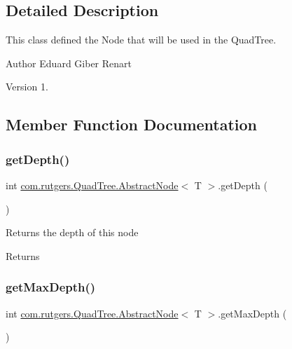 \subsection{Detailed Description}
This class defined the Node that will be used in the Quad\+Tree.

\begin{DoxyAuthor}{Author}
Eduard Giber Renart 
\end{DoxyAuthor}
\begin{DoxyVersion}{Version}
1. 
\end{DoxyVersion}


\subsection{Member Function Documentation}
\mbox{\label{classcom_1_1rutgers_1_1QuadTree_1_1AbstractNode_ac3c4018f5d4369e09c58302bb9fa6012}} 
\subsubsection{\texorpdfstring{get\+Depth()}{getDepth()}}
{\footnotesize\ttfamily int \hyperlink{classcom_1_1rutgers_1_1QuadTree_1_1AbstractNode}{com.\+rutgers.\+Quad\+Tree.\+Abstract\+Node}$<$ T $>$.get\+Depth (\begin{DoxyParamCaption}{ }\end{DoxyParamCaption})}

Returns the depth of this node

\begin{DoxyReturn}{Returns}

\end{DoxyReturn}
\mbox{\label{classcom_1_1rutgers_1_1QuadTree_1_1AbstractNode_a914674ce25b34e9818256028eabedf12}} 
\subsubsection{\texorpdfstring{get\+Max\+Depth()}{getMaxDepth()}}
{\footnotesize\ttfamily int \hyperlink{classcom_1_1rutgers_1_1QuadTree_1_1AbstractNode}{com.\+rutgers.\+Quad\+Tree.\+Abstract\+Node}$<$ T $>$.get\+Max\+Depth (\begin{DoxyParamCaption}{ }\end{DoxyParamCaption})}

